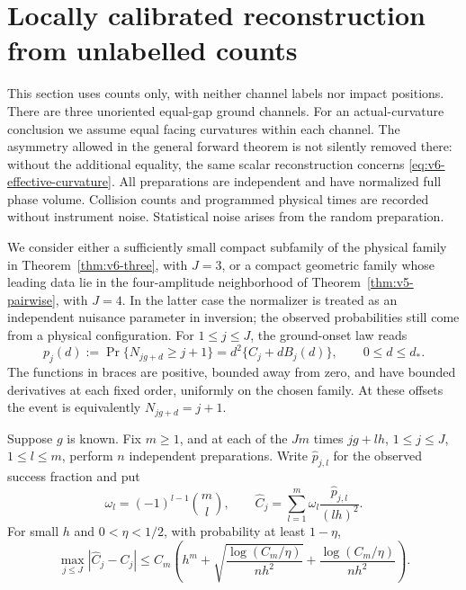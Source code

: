 \section{Locally calibrated reconstruction from unlabelled counts}
\label{sec:v6-counts}
This section uses counts only, with neither channel labels nor impact
positions. There are three unoriented equal-gap ground channels. For an
actual-curvature conclusion we assume equal facing curvatures within
each channel. The asymmetry allowed in the general forward theorem is
not silently removed there: without the additional equality, the same
scalar reconstruction concerns \eqref{eq:v6-effective-curvature}.
All preparations are independent and have normalized full phase volume.
Collision counts and programmed physical times are recorded without
instrument noise. Statistical noise arises from the random preparation.

We consider either a sufficiently small compact subfamily of the
physical family in Theorem~\ref{thm:v6-three}, with $J=3$, or a compact
geometric family whose leading data lie in the four-amplitude neighborhood
of Theorem~\ref{thm:v5-pairwise}, with $J=4$. In the latter case the
normalizer is treated as an independent nuisance parameter in inversion;
the observed probabilities still come from a physical configuration.
For $1\le j\le J$, the ground-onset law reads
\begin{equation}\label{eq:v6-count-expansion}
 p_j(d):=\Pr\{N_{jg+d}\ge j+1\}
       =d^2\{C_j+dB_j(d)\},\qquad 0\le d\le d_*.
\end{equation}
The functions in braces are positive, bounded away from zero, and have
bounded derivatives at each fixed order, uniformly on the chosen family.
At these offsets the event is equivalently $N_{jg+d}=j+1$.

\begin{lemma}
\label{lem:v6-amplitudes}
Suppose $g$ is known. Fix $m\ge1$, and at each of the $Jm$ times
$jg+lh$, $1\le j\le J$, $1\le l\le m$, perform $n$ independent
preparations. Write $\widehat p_{j,l}$ for the observed success fraction
and put
\[
 \omega_l=(-1)^{l-1}\binom ml,\qquad
 \widehat C_j=\sum_{l=1}^m\omega_l
                         \frac{\widehat p_{j,l}}{(lh)^2}.
\]
For small $h$ and $0<\eta<1/2$, with probability at least $1-\eta$,
\begin{equation}\label{eq:v6-amplitude-concentration}
 \max_{j\le J}|\widehat C_j-C_j|
 \le C_m\left(h^m+
       \sqrt{\frac{\log(C_m/\eta)}{nh^2}}
                    +\frac{\log(C_m/\eta)}{nh^2}\right).
\end{equation}
\end{lemma}

